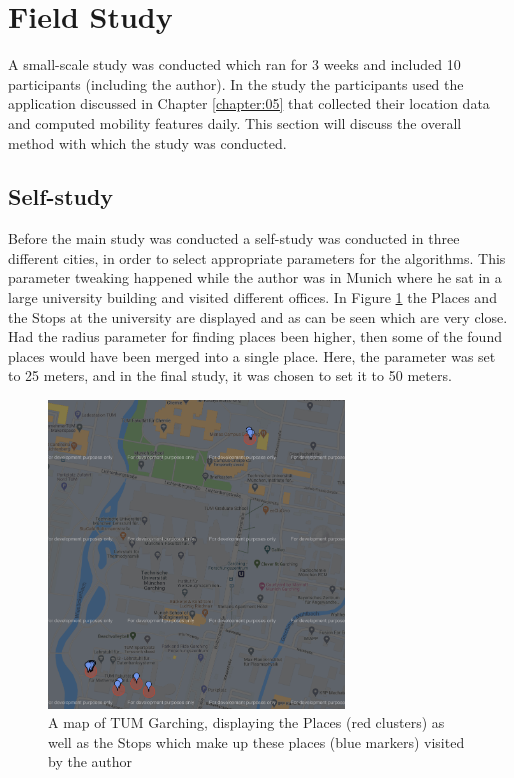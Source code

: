 \section{Field Study}
A small-scale study was conducted which ran for 3 weeks and included 10 participants (including the author). In the study the participants used the application discussed in Chapter \ref{chapter:05} that collected their location data and computed mobility features daily. This section will discuss the overall method with which the study was conducted.

\subsection{Self-study}
Before the main study was conducted a self-study was conducted in three different cities, in order to select appropriate parameters for the algorithms. This parameter tweaking happened while the author was in Munich where he sat in a large university building and visited different offices. In Figure \ref{fig:tum-map} the Places and the Stops at the university are displayed and as can be seen which are very close. Had the radius parameter for finding places been higher, then some of the found places would have been merged into a single place. Here, the parameter was set to 25 meters, and in the final study, it was chosen to set it to 50 meters.

\begin{figure}
    \centering
    \includegraphics[width=0.7\textwidth]{images/map/map-tum.png}
    \caption{A map of TUM Garching, displaying the Places (red clusters) as well as the Stops which make up these places (blue markers) visited by the author}
    \label{fig:tum-map}
\end{figure}


